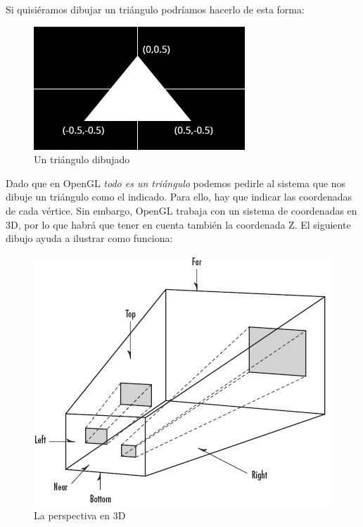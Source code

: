 \documentclass[a4paper,12pt,spanish]{sphinxmanual}
\begin{document}
Si quisiéramos dibujar un triángulo podríamos hacerlo de esta forma:
\begin{figure}[htbp]
\centering
\capstart

\includegraphics{triangulo.png}
\caption{Un triángulo dibujado}\end{figure}

Dado que en OpenGL \emph{todo es un triángulo} podemos pedirle al sistema que nos dibuje un triángulo como el indicado. Para ello, hay que indicar las coordenadas de cada vértice. Sin embargo, OpenGL trabaja con un sistema de coordenadas en 3D, por lo que habrá que tener en cuenta también la coordenada Z. El siguiente dibujo ayuda a ilustrar como funciona:
\begin{figure}[htbp]
\centering
\capstart

\includegraphics{perspectiva.png}
\caption{La perspectiva en 3D}\end{figure}
\end{document}
